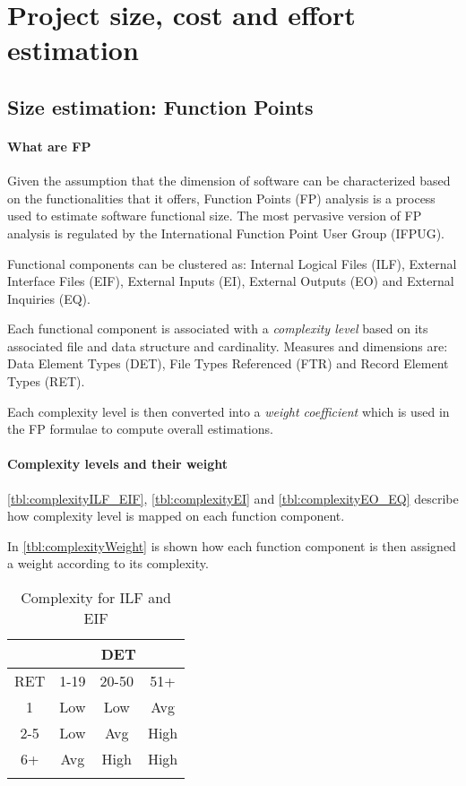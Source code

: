 \section[Project estimations]{Project size, cost and effort estimation}

\subsection{Size estimation: Function Points}
\paragraph{What are FP}Given the assumption that the dimension of software can be characterized based on the functionalities that it offers, Function Points (FP) analysis is a process used to estimate software functional size. The most pervasive version of FP analysis is regulated by the International Function Point User Group (IFPUG).

Functional components can be clustered as: Internal Logical Files (ILF), External Interface Files (EIF), External Inputs (EI), External Outputs (EO) and External Inquiries (EQ).

Each functional component is associated with a \emph{complexity level} based on its associated file and data structure and cardinality. Measures and dimensions are: Data Element Types (DET), File Types Referenced (FTR) and Record Element Types (RET).

Each complexity level is then converted into a \emph{weight coefficient} which is used in the FP formulae to compute overall estimations.

\paragraph{Complexity levels and their weight}\autoref{tbl:complexityILF_EIF}, \autoref{tbl:complexityEI} and \autoref{tbl:complexityEO_EQ} describe how complexity level is mapped on each function component. 

In \autoref{tbl:complexityWeight} is shown how each function component is then assigned a weight
according to its complexity.


\begin{longtable}{cccc}
\toprule
\multicolumn{1}{c}{} & 
\multicolumn{3}{c}{DET}\\
\midrule
RET & 1-19 & 20-50 & 51+ \\
\midrule
1	&	Low	&	Low		&	Avg \\
2-5	&	Low	&	Avg		&	High \\
6+	&	Avg	&	High	&	High\\
\bottomrule
\caption{Complexity for ILF and EIF}
\label{tbl:complexityILF_EIF}
\end{longtable}

